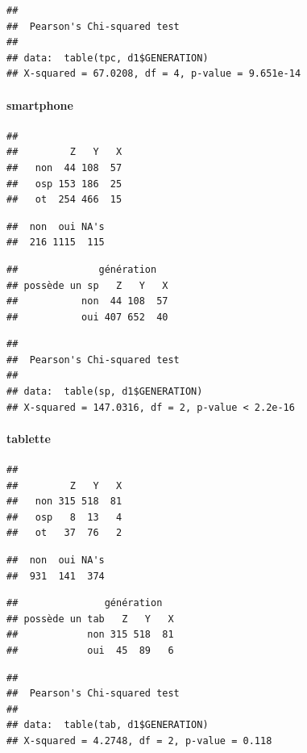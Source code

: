 \documentclass[]{article}
\begin{document}
\begin{verbatim}
## 
##  Pearson's Chi-squared test
## 
## data:  table(tpc, d1$GENERATION)
## X-squared = 67.0208, df = 4, p-value = 9.651e-14
\end{verbatim}

\paragraph{smartphone}\label{smartphone}

\begin{verbatim}
##      
##         Z   Y   X
##   non  44 108  57
##   osp 153 186  25
##   ot  254 466  15
\end{verbatim}

\begin{verbatim}
##  non  oui NA's 
##  216 1115  115
\end{verbatim}

\begin{verbatim}
##              génération
## possède un sp   Z   Y   X
##           non  44 108  57
##           oui 407 652  40
\end{verbatim}

\begin{verbatim}
## 
##  Pearson's Chi-squared test
## 
## data:  table(sp, d1$GENERATION)
## X-squared = 147.0316, df = 2, p-value < 2.2e-16
\end{verbatim}

\paragraph{tablette}\label{tablette}

\begin{verbatim}
##      
##         Z   Y   X
##   non 315 518  81
##   osp   8  13   4
##   ot   37  76   2
\end{verbatim}

\begin{verbatim}
##  non  oui NA's 
##  931  141  374
\end{verbatim}

\begin{verbatim}
##               génération
## possède un tab   Z   Y   X
##            non 315 518  81
##            oui  45  89   6
\end{verbatim}

\begin{verbatim}
## 
##  Pearson's Chi-squared test
## 
## data:  table(tab, d1$GENERATION)
## X-squared = 4.2748, df = 2, p-value = 0.118
\end{verbatim}
\end{document}

